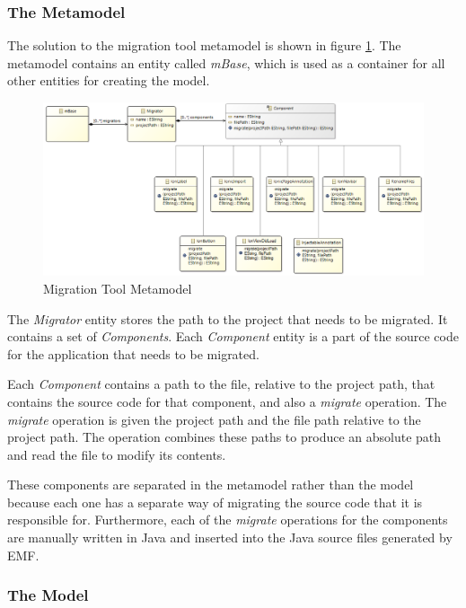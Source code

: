 \documentclass[conference]{IEEEtran}
\begin{document}
\subsubsection{The Metamodel}

The solution to the migration tool metamodel is shown in figure \ref{fig:metamodel}. The metamodel contains an entity called \textit{mBase}, which is used as a container for all other entities for creating the model.

\begin{figure}[htbp]
\centerline{\includegraphics[width=\linewidth,keepaspectratio]{metamodel.png}}
\caption{Migration Tool Metamodel}
\label{fig:metamodel}
\end{figure}

The \textit{Migrator} entity stores the path to the project that needs to be migrated. It contains a set of \textit{Components}. Each \textit{Component} entity is a part of the source code for the application that needs to be migrated.

Each \textit{Component} contains a path to the file, relative to the project path, that contains the source code for that component, and also a \textit{migrate} operation. The \textit{migrate} operation is given the project path and the file path relative to the project path. The operation combines these paths to produce an absolute path and read the file to modify its contents.

These components are separated in the metamodel rather than the model because each one has a separate way of migrating the source code that it is responsible for. Furthermore, each of the \textit{migrate} operations for the components are manually written in Java and inserted into the Java source files generated by EMF.

\subsubsection{The Model}
\end{document}
